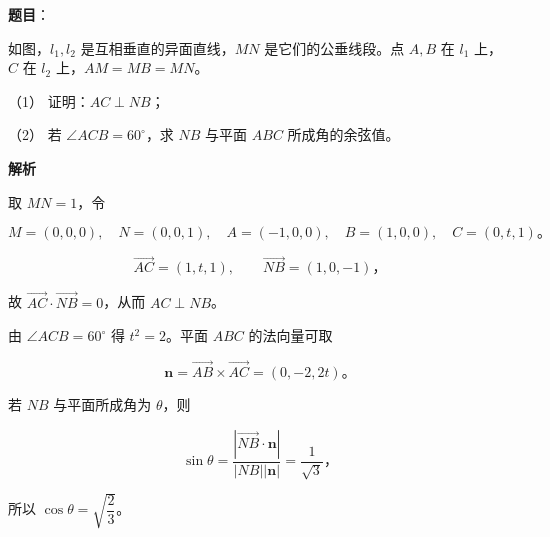 \begin{answer}

\textbf{题目}：

如图，$l_1,l_2$ 是互相垂直的异面直线，$MN$ 是它们的公垂线段。点 $A,B$ 在 $l_1$ 上，$C$ 在 $l_2$ 上，$AM=MB=MN$。
\nopagebreak[4]
\begin{center}\end{center}
\nopagebreak[4]
（1） 证明：$AC\perp NB$；

（2） 若 $\angle ACB=60^\circ$，求 $NB$ 与平面 $ABC$ 所成角的余弦值。

\textbf{解析}

取 $MN=1$，令

\nopagebreak[4]
\[
M=(0,0,0),\quad N=(0,0,1),\quad A=(-1,0,0),\quad B=(1,0,0),\quad C=(0,t,1)\text{。}
\]


\nopagebreak[4]
\[
\overrightarrow{AC}=(1,t,1),\qquad \overrightarrow{NB}=(1,0,-1)\text{，}
\]

故 $\overrightarrow{AC}\cdot\overrightarrow{NB}=0$，从而 $AC\perp NB$。


由 $\angle ACB=60^\circ$ 得 $t^2=2$。平面 $ABC$ 的法向量可取

\nopagebreak[4]
\[
\boldsymbol n=\overrightarrow{AB}\times\overrightarrow{AC}=(0,-2,2t)\text{。}
\]

若 $NB$ 与平面所成角为 $\theta$，则

\nopagebreak[4]
\[
\sin\theta=\frac{|\overrightarrow{NB}\cdot\boldsymbol n|}{|NB||\boldsymbol n|}=\frac1{\sqrt3}\text{，}
\]

所以 $\cos\theta=\sqrt{\dfrac23}$。



\end{answer}

